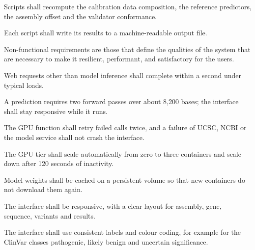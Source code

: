 \vspace{4pt}
\begin{subitemize}
\item Scripts shall recompute the calibration data composition, the reference predictors, the assembly offset and the validator conformance.
\item Each script shall write its results to a machine-readable output file.
\end{subitemize}


Non-functional requirements are those that define the qualities of the system that are necessary to make it resilient, performant, and satisfactory for the users.

\begin{subitemize}
\item Web requests other than model inference shall complete within a second under typical loads.
\item A prediction requires two forward passes over about 8,200 bases; the interface shall stay responsive while it runs.
\end{subitemize}

\begin{subitemize}
\item The GPU function shall retry failed calls twice, and a failure of UCSC, NCBI or the model service shall not crash the interface.
\end{subitemize}

\begin{subitemize}
\item The GPU tier shall scale automatically from zero to three containers and scale down after 120 seconds of inactivity.
\item Model weights shall be cached on a persistent volume so that new containers do not download them again.
\end{subitemize}

\vspace{4pt}
\begin{subitemize}
\item The interface shall be responsive, with a clear layout for assembly, gene, sequence, variants and results.
\item The interface shall use consistent labels and colour coding, for example for the ClinVar classes pathogenic, likely benign and uncertain significance.
\end{subitemize}

